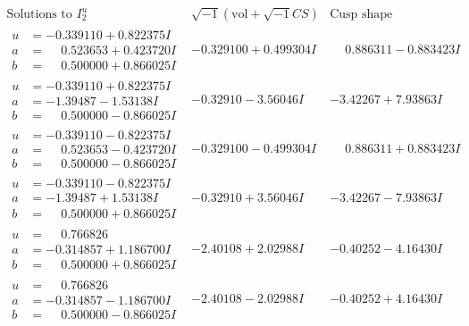 \documentclass[1p]{elsarticle_modified}
\theoremstyle{definition}
\newcommand{\I}{\sqrt{-1}}
\begin{document}
$$\begin{array}{c|c|c}  
\text{Solutions to }I^u_{2}& \I (\text{vol} + \sqrt{-1}CS) & \text{Cusp shape}\\
 \hline 
\begin{aligned}
u &= -0.339110 + 0.822375 I \\
a &= \phantom{-}0.523653 + 0.423720 I \\
b &= \phantom{-}0.500000 + 0.866025 I\end{aligned}
 & -0.329100 + 0.499304 I & \phantom{-}0.886311 - 0.883423 I \\ \hline\begin{aligned}
u &= -0.339110 + 0.822375 I \\
a &= -1.39487 - 1.53138 I \\
b &= \phantom{-}0.500000 - 0.866025 I\end{aligned}
 & -0.32910 - 3.56046 I & -3.42267 + 7.93863 I \\ \hline\begin{aligned}
u &= -0.339110 - 0.822375 I \\
a &= \phantom{-}0.523653 - 0.423720 I \\
b &= \phantom{-}0.500000 - 0.866025 I\end{aligned}
 & -0.329100 - 0.499304 I & \phantom{-}0.886311 + 0.883423 I \\ \hline\begin{aligned}
u &= -0.339110 - 0.822375 I \\
a &= -1.39487 + 1.53138 I \\
b &= \phantom{-}0.500000 + 0.866025 I\end{aligned}
 & -0.32910 + 3.56046 I & -3.42267 - 7.93863 I \\ \hline\begin{aligned}
u &= \phantom{-}0.766826\phantom{ +0.000000I} \\
a &= -0.314857 + 1.186700 I \\
b &= \phantom{-}0.500000 + 0.866025 I\end{aligned}
 & -2.40108 + 2.02988 I & -0.40252 - 4.16430 I \\ \hline\begin{aligned}
u &= \phantom{-}0.766826\phantom{ +0.000000I} \\
a &= -0.314857 - 1.186700 I \\
b &= \phantom{-}0.500000 - 0.866025 I\end{aligned}
 & -2.40108 - 2.02988 I & -0.40252 + 4.16430 I \\ \hline\begin{aligned}

\end{aligned}
\end{array}$$
\end{document}

